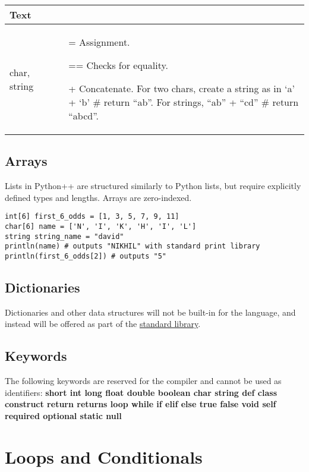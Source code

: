 \documentclass{article}
\begin{document}
\begin{center}
\begin{tabularx}{\textwidth}[t]{XX}
\hline
\multicolumn{2}{l}{%
\textbf{\textcolor{myGreen}{Text}}} \\
\hline

char, string &
\begin{minipage}[t]{\linewidth}%
\begin{itemize}
\item[=] Assignment.
\item[==] Checks for equality.
\item[+] Concatenate. For two chars, create a string as in `a' + `b' \# return ``ab''. For strings, ``ab'' + ``cd'' \# return ``abcd''.
\end{itemize} 
\end{minipage}
\end{tabularx}
\end{center}

\subsection{Arrays}
Lists in Python++ are structured similarly to Python lists, but require explicitly defined types and lengths. Arrays are zero-indexed.

\begin{verbatim}
int[6] first_6_odds = [1, 3, 5, 7, 9, 11]
char[6] name = ['N', 'I', 'K', 'H', 'I', 'L']
string string_name = "david"
println(name) # outputs "NIKHIL" with standard print library
println(first_6_odds[2]) # outputs "5"
\end{verbatim}

\subsection{Dictionaries}
Dictionaries and other data structures will not be built-in for the language, and instead will be offered as part of the \hyperref[sec:stl]{standard library}.

\subsection{Keywords}
The following keywords are reserved for the compiler and cannot be used as identifiers:
\textbf{short int long float double boolean char string def class construct return returns loop while if elif else true false void self required optional static null}

\section{Loops and Conditionals}
\end{document}
